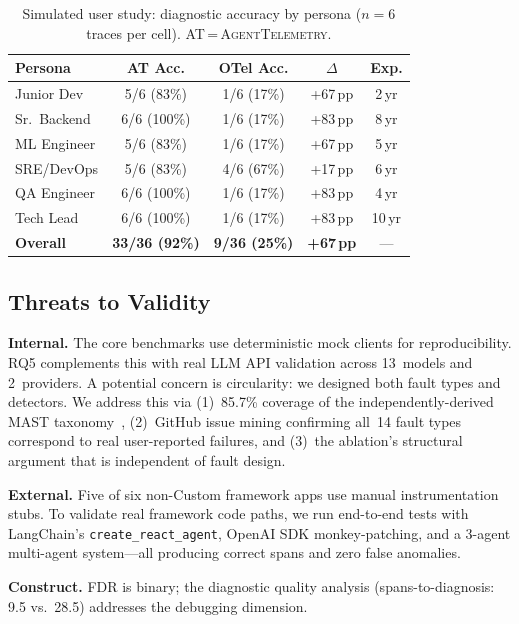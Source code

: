 \documentclass{article}
\begin{document}
\begin{table}[t]
\centering
\small
\caption{Simulated user study: diagnostic accuracy by persona
($n{=}6$ traces per cell).  AT\,=\,\textsc{AgentTelemetry}.}
\label{tab:user-study}
\begin{tabular}{@{}lcccc@{}}
\toprule
\textbf{Persona} & \textbf{AT Acc.} & \textbf{OTel Acc.} & \textbf{$\Delta$} & \textbf{Exp.} \\
\midrule
Junior Dev        & 5/6 (83\%)  & 1/6 (17\%) & +67\,pp & 2\,yr \\
Sr.\ Backend      & 6/6 (100\%) & 1/6 (17\%) & +83\,pp & 8\,yr \\
ML Engineer       & 5/6 (83\%)  & 1/6 (17\%) & +67\,pp & 5\,yr \\
SRE/DevOps        & 5/6 (83\%)  & 4/6 (67\%) & +17\,pp & 6\,yr \\
QA Engineer       & 6/6 (100\%) & 1/6 (17\%) & +83\,pp & 4\,yr \\
Tech Lead         & 6/6 (100\%) & 1/6 (17\%) & +83\,pp & 10\,yr \\
\midrule
\textbf{Overall}  & \textbf{33/36 (92\%)} & \textbf{9/36 (25\%)} & \textbf{+67\,pp} & --- \\
\bottomrule
\end{tabular}
\end{table}

\subsection{Threats to Validity}

\textbf{Internal.}  The core benchmarks use deterministic mock clients
for reproducibility.  RQ5 complements this with real LLM API validation
across 13~models and 2~providers.  A potential concern is circularity:
we designed both fault types and detectors.  We address this via (1)~85.7\%
coverage of the independently-derived MAST taxonomy~\citep{mast},
(2)~GitHub issue mining confirming all~14 fault types correspond to
real user-reported failures, and (3)~the ablation's structural
argument that is independent of fault design.

\textbf{External.}  Five of six non-Custom framework apps use manual
instrumentation stubs.  To validate real framework code paths, we run
end-to-end tests with LangChain's \texttt{create\_react\_agent},
OpenAI SDK monkey-patching, and a 3-agent multi-agent system---all
producing correct spans and zero false anomalies.

\textbf{Construct.}  FDR is binary; the diagnostic quality analysis
(spans-to-diagnosis: 9.5 vs.\ 28.5) addresses the debugging dimension.
\end{document}
